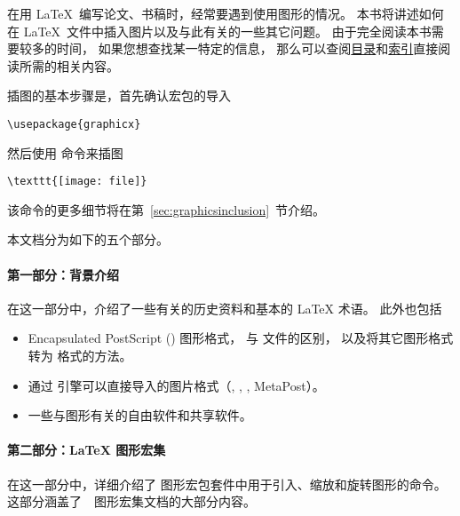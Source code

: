 在用 \LaTeX\ 编写论文、书稿时，经常要遇到使用图形的情况。
本书将讲述如何在 \LaTeX\ 文件中插入图片以及与此有关的一些其它问题。
由于完全阅读本书需要较多的时间，
如果您想查找某一特定的信息，
那么可以查阅\hyperref[toc]{目录}和\hyperref[sec:index]{索引}直接阅读所需的相关内容。

插图的基本步骤是，首先确认宏包的导入
\begin{lstlisting}
\usepackage{graphicx}
\end{lstlisting}
然后使用  命令来插图
\begin{lstlisting}
\texttt{[image: file]}
\end{lstlisting}
该命令的更多细节将在第~\ref{sec:graphicsinclusion}~节介绍。

本文档分为如下的五个部分。

\paragraph{第一部分：背景介绍}
在这一部分中，介绍了一些有关的历史资料和基本的 \LaTeX{} 术语。
此外也包括
\begin{itemize}
	\item Encapsulated PostScript () 图形格式， 与  文件的区别，
	以及将其它图形格式转为  格式的方法。
	\item 通过 \pdfTeX 引擎可以直接导入的图片格式（, , , MetaPost）。
	\item 一些与图形有关的自由软件和共享软件。
\end{itemize}

\paragraph{第二部分：\LaTeX{} 图形宏集}
在这一部分中，详细介绍了 \LaTeXe{} 图形宏包套件中用于引入、缩放和旋转图形的命令。
这部分涵盖了~\LaTeXe{}~图形宏集文档的大部分内容\cite{grfguide}。

